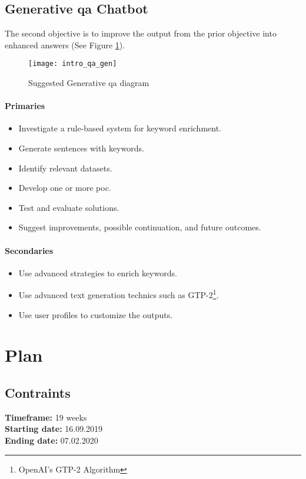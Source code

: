\subsection*{Generative \gls{qa} Chatbot}
The second objective is to improve the output from the prior objective into enhanced answers (See Figure \ref{fig:spec_qa_gen}).
\begin{figure}[ht!]
    \centering
    \texttt{[image: intro\_qa\_gen]}
    \caption{Suggested Generative \gls{qa} diagram}
    \label{fig:spec_qa_gen}
\end{figure}

\paragraph{Primaries}
\begin{itemize}[noitemsep]
    \item Investigate a rule-based system for keyword enrichment.
    \item Generate sentences with keywords.
    \item Identify relevant datasets.
    \item Develop one or more \gls{poc}.
    \item Test and evaluate solutions.
    \item Suggest improvements, possible continuation, and future outcomes.
\end{itemize}
\paragraph{Secondaries}
\begin{itemize}[noitemsep]
    \item Use advanced strategies to enrich keywords.
    \item Use advanced text generation technics such as GTP-2\footnote{OpenAI's GTP-2 Algorithm\cite{papers:gpt2}}.
    \item Use user profiles to customize the outputs.
\end{itemize}


\section*{Plan}
\label{plan:plan}
\subsection*{Contraints}
\textbf{Timeframe:} 19 weeks\\
\textbf{Starting date:} 16.09.2019\\
\textbf{Ending date:} 07.02.2020

